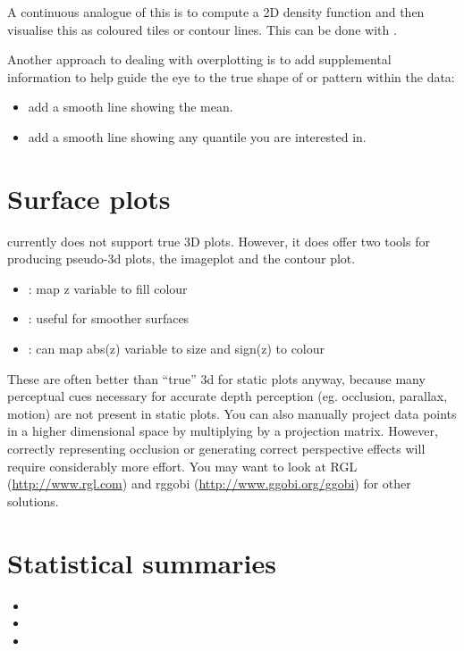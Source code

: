 A continuous analogue of this is to compute a 2D density function and then visualise this as coloured tiles or contour lines.  This can be done with .

Another approach to dealing with overplotting is to add supplemental information to help guide the eye to the true shape of or pattern within the data:

\begin{itemize}
	\item {} add a smooth line showing the mean.
	\item {} add a smooth line showing any quantile you are interested in.
\end{itemize}

\section{Surface plots}
\label{sec:surface}

\ggplot currently does not support true 3D plots.  However, it does offer two tools for producing pseudo-3d plots, the imageplot and the contour plot.

\begin{itemize}
	\item {}: map z variable to fill colour
	\item {}: useful for smoother surfaces
	\item {}: can map abs(z) variable to size and sign(z) to colour
\end{itemize}

These are often better than ``true'' 3d for static plots anyway, because many perceptual cues necessary for accurate depth perception (eg. occlusion, parallax, motion) are not present in static plots.  You can also manually project data points in a higher dimensional space by multiplying by a projection matrix.  However, correctly representing occlusion or generating correct perspective effects will require considerably more effort.  You may want to look at RGL (\url{http://www.rgl.com}) and rggobi (\url{http://www.ggobi.org/ggobi}) for other solutions.

\section{Statistical summaries}
\label{sec:summary}

\begin{itemize}
  \item {}
  \item {}
  \item {}
\end{itemize}

